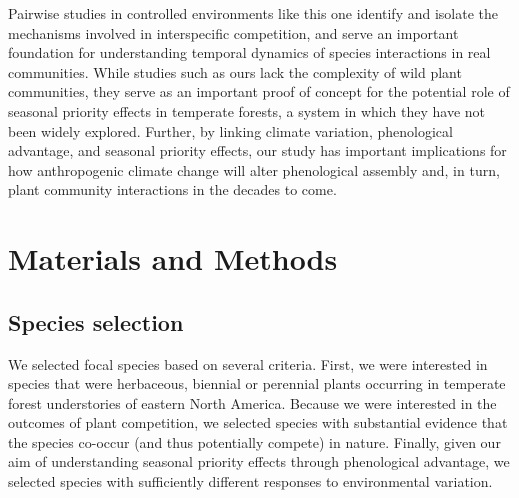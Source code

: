 \documentclass{article}[11pt]
\begin{document}
Pairwise studies in controlled environments like this one identify and isolate the mechanisms involved in interspecific competition, and serve an important foundation for understanding temporal dynamics of species interactions in real communities. While studies such as ours lack the complexity of wild plant communities, they serve as an important proof of concept for the potential role of seasonal priority effects in temperate forests, a system in which they have not been widely explored. Further, by linking climate variation, phenological advantage, and seasonal priority effects, our study has important implications for how anthropogenic climate change will alter phenological assembly and, in turn, plant community interactions in the decades to come.



\section*{Materials and Methods}

\subsection*{Species selection}
We selected focal species based on several criteria. First, we were interested in species that were herbaceous, biennial or perennial plants occurring in temperate forest understories of eastern North America. Because we were interested in the outcomes of plant competition, we selected species with substantial evidence that the species co-occur (and thus potentially compete) in nature. Finally, given our aim of understanding seasonal priority effects through phenological advantage, we selected species with sufficiently different responses to environmental variation.
\end{document}
